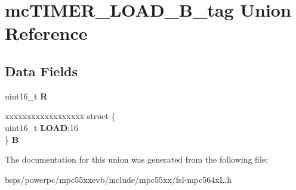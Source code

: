 \hypertarget{unionmcTIMER__LOAD__16B__tag}{}\section{mc\+T\+I\+M\+E\+R\+\_\+\+L\+O\+A\+D\+\_\+B\+\_\+tag Union Reference}
\label{unionmcTIMER__LOAD__16B__tag}
\subsection*{Data Fields}
\begin{DoxyCompactItemize}
\item 
\mbox{\label{unionmcTIMER__LOAD__16B__tag_ac056fdf7bb54e124cc0ead5088ad8462}} 
uint16\+\_\+t {\bfseries R}
\item 
\mbox{\label{unionmcTIMER__LOAD__16B__tag_a41b3c3a0e6452b5eb16bc6234521eedc}} 
\begin{tabbing}
xx\=xx\=xx\=xx\=xx\=xx\=xx\=xx\=xx\=\kill
struct \{\\
\>uint16\_t {\bfseries LOAD}:16\\
\} {\bfseries B}\\

\end{tabbing}\end{DoxyCompactItemize}


The documentation for this union was generated from the following file\+:\begin{DoxyCompactItemize}
\item 
bsps/powerpc/mpc55xxevb/include/mpc55xx/fsl-\/mpc564x\+L.\+h\end{DoxyCompactItemize}
